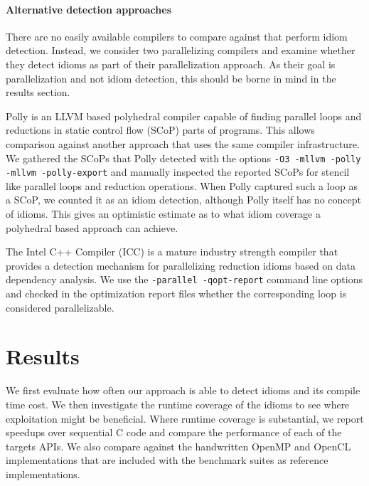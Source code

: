     \paragraph*{Alternative detection approaches}
    \hspace{0.2cm}There are no easily available compilers to compare against
    that perform idiom detection.
    Instead, we consider two parallelizing compilers and examine
    whether they detect idioms as part of their parallelization approach.
    As their goal is parallelization and not idiom detection, this should be
    borne in mind in the results section.

    Polly \cite{Doerfert2015Polly} is an LLVM based polyhedral compiler
    capable of finding parallel loops and reductions in static control
    flow (SCoP) parts of programs.  This allows comparison against
    another approach that uses the same compiler infrastructure.
    We gathered the SCoPs that Polly detected with the options
    \texttt{-O3 -mllvm -polly -mllvm -polly-export} and manually inspected
    the reported SCoPs for stencil like parallel loops and reduction operations.
    When Polly captured such a loop as a SCoP, we counted it as an idiom
    detection, although Polly itself has no concept of idioms.
    This gives an optimistic estimate as to what idiom coverage a polyhedral
    based approach can achieve.

    The Intel C++ Compiler (ICC) is a mature industry strength compiler that
    provides a detection mechanism for parallelizing reduction idioms based on
    data dependency analysis.
    We use the \texttt{-parallel -qopt-report} command line options and checked
    in the optimization report files whether the corresponding loop is
    considered parallelizable.

\section{Results}

    We first evaluate how often our approach is able to detect idioms and its
    compile time cost.
    We then investigate the runtime coverage of the idioms to see where
    exploitation might be beneficial.
    Where runtime coverage is substantial, we report speedups over sequential C
    code and compare the performance of each of the targets APIs.
    We also compare against the handwritten OpenMP and OpenCL implementations
    that are included with the benchmark suites as reference implementations.

